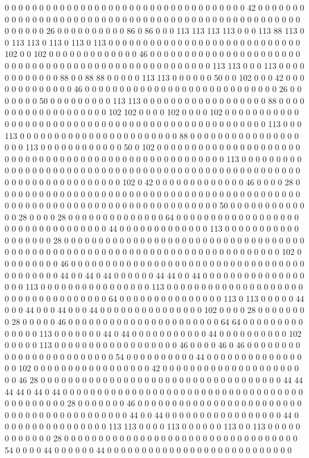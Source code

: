 0 0 0 0 0 0 0 0 0 0 0 0 0 0 0 0 0 0 0 0 0 0 0 0 0 0 0 0 0 0 0 0 0 0 0 42 0 0 0 0 0 0 0 0 0 0 0 0 0 0 0 0 0 0 0 0 0 0 0 0 0 0 0 0 0 0 0 0 0 0 0 0 0 0 0 0 0 0 0 0 0 0 0 0 0 0 0 0 0 0 0 0 26 0 0 0 0 0 0 0 0 0 0 86 0 86 0 0 0 113 113 113 113 0 0 0 113 88 113 0 0 113 113 0 113 0 113 0 113 0 0 0 0 0 0 0 0 0 0 0 0 0 0 0 0 0 0 0 0 0 0 0 0 0 0 0 0 102 0 0 102 0 0 0 0 0 0 0 0 0 0 0 0 0 46 0 0 0 0 0 0 0 0 0 0 0 0 0 0 0 0 0 0 0 0 0 0 0 0 0 0 0 0 0 0 0 0 0 0 0 0 0 0 0 0 0 0 0 0 0 0 0 0 0 0 0 0 113 113 0 0 0 113 0 0 0 0 0 0 0 0 0 0 0 0 88 0 0 88 88 0 0 0 0 0 113 113 0 0 0 0 0 0 50 0 0 102 0 0 0 42 0 0 0 0 0 0 0 0 0 0 0 0 0 46 0 0 0 0 0 0 0 0 0 0 0 0 0 0 0 0 0 0 0 0 0 0 0 0 0 0 0 0 26 0 0 0 0 0 0 0 50 0 0 0 0 0 0 0 0 0 113 113 0 0 0 0 0 0 0 0 0 0 0 0 0 0 0 0 0 0 88 0 0 0 0 0 0 0 0 0 0 0 0 0 0 0 0 0 0 0 102 102 0 0 0 0 102 0 0 0 0 102 0 0 0 0 0 0 0 0 0 0 0 0 0 0 0 0 0 0 0 0 0 0 0 0 0 0 0 0 0 0 0 0 0 0 0 0 0 0 0 0 0 0 0 0 0 0 0 0 0 113 0 0 0 113 0 0 0 0 0 0 0 0 0 0 0 0 0 0 0 0 0 0 0 0 0 0 0 88 0 0 0 0 0 0 0 0 0 0 0 0 0 0 0 0 0 0 0 113 0 0 0 0 0 0 0 0 0 0 0 0 50 0 102 0 0 0 0 0 0 0 0 0 0 0 0 0 0 0 0 0 0 0 0 0 0 0 0 0 0 0 0 0 0 0 0 0 0 0 0 0 0 0 0 0 0 0 0 0 0 0 0 0 0 0 0 0 113 0 0 0 0 0 0 0 0 0 0 0 0 0 0 0 0 0 0 0 0 0 0 0 0 0 0 0 0 0 0 0 0 0 0 0 0 0 0 0 0 0 0 0 0 0 0 0 0 0 0 0 0 0 0 0 0 0 0 0 0 0 0 0 0 0 0 0 0 0 102 0 42 0 0 0 0 0 0 0 0 0 0 0 0 0 46 0 0 0 0 28 0 0 0 0 0 0 0 0 0 0 0 0 0 0 0 0 0 0 0 0 0 0 0 0 0 0 0 0 0 0 0 0 0 0 0 0 0 0 0 0 0 0 0 0 0 0 0 0 0 0 0 0 0 0 0 0 0 0 0 0 0 0 0 0 0 0 0 0 0 0 0 0 0 0 0 50 0 0 0 0 0 0 0 0 0 0 0 0 0 28 0 0 0 0 28 0 0 0 0 0 0 0 0 0 0 0 0 0 0 64 0 0 0 0 0 0 0 0 0 0 0 0 0 0 0 0 0 0 0 0 0 0 0 0 0 0 0 0 0 0 0 0 0 44 0 0 0 0 0 0 0 0 0 0 0 0 0 113 0 0 0 0 0 0 0 0 0 0 0 0 0 0 0 0 0 0 28 0 0 0 0 0 0 0 0 0 0 0 0 0 0 0 0 0 0 0 0 0 0 0 0 0 0 0 0 0 0 0 0 0 0 0 0 0 0 0 0 0 0 0 0 0 0 0 0 0 0 0 0 0 0 0 0 0 0 0 0 0 0 0 0 0 0 0 0 0 0 0 0 0 0 0 102 0 0 0 0 0 0 0 0 0 46 0 0 0 0 0 0 0 0 0 0 0 0 0 0 0 0 0 0 0 0 0 0 0 0 0 0 0 0 0 0 0 0 0 0 0 0 0 0 0 0 0 0 44 0 0 44 0 44 0 0 0 0 0 0 44 44 0 0 44 0 0 0 0 0 0 0 0 0 0 0 0 0 0 0 0 0 0 113 0 0 0 0 0 0 0 0 0 0 0 0 0 0 0 0 113 0 0 0 0 0 0 0 0 0 0 0 0 0 0 0 0 0 0 0 0 0 0 0 0 0 0 0 0 0 0 0 0 0 0 0 64 0 0 0 0 0 0 0 0 0 0 0 0 0 0 0 113 0 113 0 0 0 0 0 44 0 0 0 44 0 0 0 44 0 0 0 44 0 0 0 0 0 0 0 0 0 0 0 0 0 0 0 102 0 0 0 0 28 0 0 0 0 0 0 0 0 28 0 0 0 0 0 46 0 0 0 0 0 0 0 0 0 0 0 0 0 0 0 0 0 0 0 0 0 0 64 64 0 0 0 0 0 0 0 0 0 0 0 0 0 0 113 0 0 0 0 0 0 0 44 0 44 0 0 0 0 0 0 0 0 0 0 0 44 0 0 0 0 0 0 0 0 0 0 102 0 0 0 0 0 113 0 0 0 0 0 0 0 0 0 0 0 0 0 0 0 0 0 0 46 0 0 0 0 46 0 46 0 0 0 0 0 0 0 0 0 0 0 0 0 0 0 0 0 0 0 0 0 0 0 0 54 0 0 0 0 0 0 0 0 0 0 44 0 0 0 0 0 0 0 0 0 0 0 0 0 0 0 0 102 0 0 0 0 0 0 0 0 0 0 0 0 0 0 0 0 0 42 0 0 0 0 0 0 0 0 0 0 0 0 0 0 0 0 0 0 0 0 0 0 46 28 0 0 0 0 0 0 0 0 0 0 0 0 0 0 0 0 0 0 0 0 0 0 0 0 0 0 0 0 0 0 0 0 0 0 0 44 44 44 44 0 44 0 44 0 0 0 0 0 0 0 0 0 0 0 0 0 0 0 0 0 0 0 0 0 0 0 0 0 0 0 0 0 0 0 0 0 0 0 0 0 0 0 0 0 0 0 0 28 0 0 0 0 0 0 0 46 0 0 0 0 0 0 0 0 0 0 0 0 0 0 0 0 0 0 0 0 0 0 0 0 0 0 0 0 0 0 0 0 0 0 0 0 0 0 0 0 0 0 44 0 0 44 0 0 0 0 0 0 0 0 0 0 0 0 0 0 0 0 0 44 0 0 0 0 0 0 0 0 0 0 0 0 0 0 0 0 113 113 0 0 0 0 113 0 0 0 0 0 0 113 0 0 113 0 0 0 0 0 0 0 0 0 0 0 0 28 0 0 0 0 0 0 0 0 0 0 0 0 0 0 0 0 0 0 0 0 0 0 0 0 0 0 0 0 0 0 0 0 0 0 54 0 0 0 0 44 0 0 0 0 0 0 44 0 0 0 0 0 0 0 0 0 0 0 0 0 0 0 0 0 0 0 0 0 0 0 0 0 0 0 
